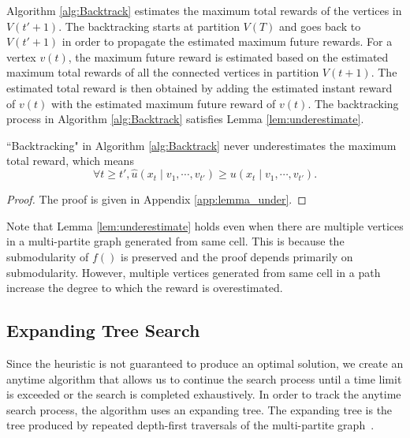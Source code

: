 Algorithm \ref{alg:Backtrack} estimates the maximum total rewards of the vertices in $ V(t'+1) $.
The backtracking starts at partition $ V(T) $ and goes back to $ V(t'+1) $ in order to propagate the estimated maximum future rewards.
For a vertex $ v(t) $, the maximum future reward is estimated based on the estimated maximum total rewards of all the connected vertices in partition $ V(t+1) $.
The estimated total reward is then obtained by adding the estimated instant reward of $ v(t) $ with the estimated maximum future reward of $ v(t) $. 
The backtracking process in Algorithm \ref{alg:Backtrack} satisfies Lemma \ref{lem:underestimate}.

\begin{lem}
\label{lem:underestimate}
``Backtracking" in Algorithm \ref{alg:Backtrack} never underestimates the maximum total reward, which means 
\begin{equation}
\label{eq:underestimate}
\forall t \geq t',
\hat{u}( x_{t} \mid v_{1} , \cdots , v_{t'} ) \geq u( x_{t} \mid v_{1} , \cdots , v_{t'} ).
\end{equation}
\begin{proof}
The proof is given in Appendix \ref{app:lemma_under}.
\end{proof}
\end{lem}
Note that Lemma \ref{lem:underestimate} holds even when there are multiple vertices in a multi-partite graph generated from same cell.
This is because the submodularity of $ f() $ is preserved and the proof depends primarily on submodularity.
However, multiple vertices generated from same cell in a path increase the degree to which the reward is overestimated.

\subsection{Expanding Tree Search}
\label{sec:expanding_tree}

Since the heuristic is not guaranteed to produce an optimal solution, we create an anytime algorithm that allows us to continue the search process until a time limit is exceeded or the search is completed exhaustively.
In order to track the anytime search process, the algorithm uses an expanding tree. The expanding tree is the tree produced by repeated depth-first traversals of the multi-partite graph~\cite{rosen2011discrete}.

